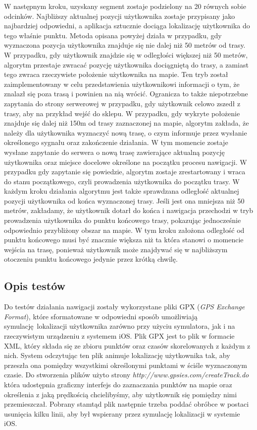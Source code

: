W następnym kroku, uzyskany segment zostaje podzielony na 20 równych sobie odcinków. Najbliższy aktualnej pozycji użytkownika zostaje przypisany jako najbardziej odpowiedni, a aplikacja sztucznie dociąga lokalizację użytkownika do tego właśnie punktu. \newline
Metoda opisana powyżej działa w przypadku, gdy wyznaczona pozycja użytkownika znajduje się nie dalej niż 50 metrów od trasy. W przypadku, gdy użytkownik znajdzie się w odległości większej niż 50 metrów, algorytm przestaje zwracać pozycję użytkownika dociągniętą do trasy, a zamiast tego zwraca rzeczywiste położenie użytkownika na mapie. Ten tryb został zaimplementowany w celu przedstawienia użytkownikowi informacji o tym, że znalazł się poza trasą i powinien na nią wrócić. Ogranicza to także niepotrzebne zapytania do strony serwerowej w przypadku, gdy użytkownik celowo zszedł z trasy, aby na przykład wejść do sklepu.
W przypadku, gdy wykryte położenie znajduje się dalej niż 150m od trasy zaznaczonej na mapie, algorytm zakłada, że należy dla użytkownika wyznaczyć nową trasę, o czym informuje przez wysłanie określonego sygnału oraz zakończenie działania. W tym momencie zostaje wysłane zapytanie do serwera o nową trasę zawierające aktualną pozycję użytkownika oraz miejsce docelowe określone na początku procesu nawigacji. W przypadku gdy zapytanie się powiedzie, algorytm zostaje zrestartowany i wraca do stanu początkowego, czyli prowadzenia użytkownika do początku trasy. \newline
W każdym kroku działania algorytmu jest także sprawdzana odległość aktualnej pozycji użytkownika od końca wyznaczonej trasy. Jeśli jest ona mniejsza niż 50 metrów, zakładamy, że użytkownik dotarł do końca i nawigacja przechodzi w tryb prowadzenia użytkownika do punktu końcowego trasy, pokazując jednocześnie odpowiednio przybliżony obszar na mapie. W tym kroku założona odległość od punktu końcowego musi być znacznie większa niż ta która stanowi o momencie wejścia na trasę, ponieważ użytkownik może znajdywać się w najbliższym otoczeniu punktu końcowego jedynie przez krótką chwilę.


\subsection{Opis testów}

Do testów działania nawigacji zostały wykorzystane pliki GPX (\textit{GPS Exchange Format}), które sformatowane w odpowiedni sposób umożliwiają symulację lokalizacji użytkownika zarówno przy użyciu symulatora, jak i na rzeczywistym urządzeniu z systemem iOS. Plik GPX jest to plik w formacie XML, który składa się ze zbioru punktów oraz czasów skorelowanych z każdym z nich. System odczytując ten plik animuje lokalizację użytkownika tak, aby przeszła ona pomiędzy wszystkimi określonymi punktami w ściśle wyznaczonym czasie. Do stworzenia plików użyto strony \textit{http://www.gpsies.com/createTrack.do} która udostępnia graficzny interfejs do zaznaczania punktów na mapie oraz określenia z jaką prędkością chcielibyśmy, aby użytkownik się pomiędzy nimi przemieszczał. Pobrany stamtąd plik następnie trzeba poddać obróbce w postaci usunięcia kilku linii, aby był wspierany przez symulację lokalizacji w systemie iOS.


